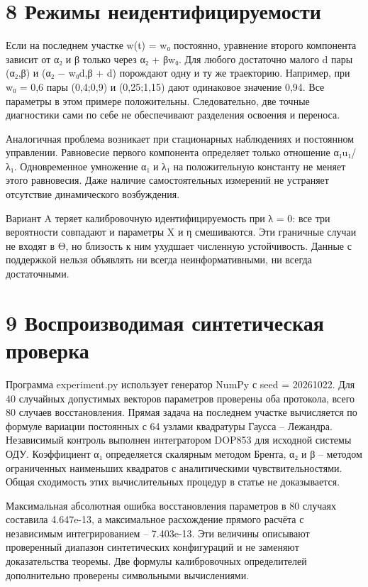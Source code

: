 \documentclass[11pt,a4paper]{article}
\begin{document}
\section*{8 Режимы неидентифицируемости}

Если на последнем участке w(t) = w₀ постоянно, уравнение второго компонента зависит от α₂ и β только через α₂ + βw₀. Для любого достаточно малого d пары (α₂,β) и (α₂ − w₀d,β + d) порождают одну и ту же траекторию. Например, при w₀ = 0,6 пары (0,4;0,9) и (0,25;1,15) дают одинаковое значение 0,94. Все параметры в этом примере положительны. Следовательно, две точные диагностики сами по себе не обеспечивают разделения освоения и переноса.\par

Аналогичная проблема возникает при стационарных наблюдениях и постоянном управлении. Равновесие первого компонента определяет только отношение α₁u₁/λ₁. Одновременное умножение α₁ и λ₁ на положительную константу не меняет этого равновесия. Даже наличие самостоятельных измерений не устраняет отсутствие динамического возбуждения.\par

Вариант A теряет калибровочную идентифицируемость при λ = 0: все три вероятности совпадают и параметры X и η смешиваются. Эти граничные случаи не входят в Θ, но близость к ним ухудшает численную устойчивость. Данные с поддержкой нельзя объявлять ни всегда неинформативными, ни всегда достаточными.\par

\section*{9 Воспроизводимая синтетическая проверка}

Программа experiment.py использует генератор NumPy с seed = 20261022. Для 40 случайных допустимых векторов параметров проверены оба протокола, всего 80 случаев восстановления. Прямая задача на последнем участке вычисляется по формуле вариации постоянных с 64 узлами квадратуры Гаусса – Лежандра. Независимый контроль выполнен интегратором DOP853 для исходной системы ОДУ. Коэффициент α₁ определяется скалярным методом Брента, α₂ и β – методом ограниченных наименьших квадратов с аналитическими чувствительностями. Общая сходимость этих вычислительных процедур в статье не доказывается.\par

Максимальная абсолютная ошибка восстановления параметров в 80 случаях составила 4.647e-13, а максимальное расхождение прямого расчёта с независимым интегрированием – 7.403e-13. Эти величины описывают проверенный диапазон синтетических конфигураций и не заменяют доказательства теоремы. Две формулы калибровочных определителей дополнительно проверены символьными вычислениями.\par
\end{document}

